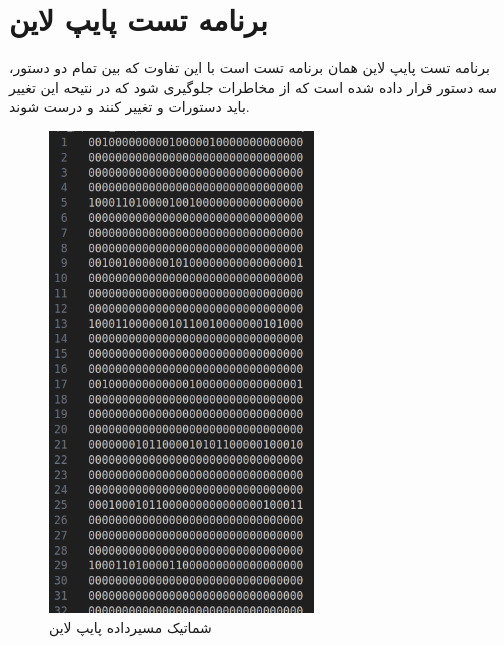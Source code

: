 \documentclass[11pt, a4paper]{article}
\begin{document}
	\section{برنامه تست پایپ لاین}
	برنامه تست پایپ لاین همان برنامه تست 
	است با این تفاوت که بین تمام دو دستور، سه دستور 
	قرار داده شده است که از مخاطرات جلوگیری شود که در نتیحه این تغییر باید دستورات 
	و
	تغییر کنند و درست شوند. 
	\begin{figure}[H]
		\begin{center}
			\includegraphics[width=7cm]{Photos/4.png}
		\end{center}
		\caption{شماتیک مسیرداده پایپ لاین}
		\label{Pipeline_schamitic}
	\end{figure}
	

 
 
	
\end{document}
